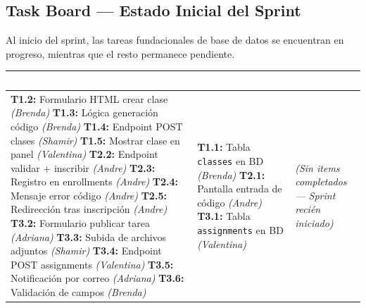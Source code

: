 \documentclass[12pt,a4paper]{article}
\renewcommand{\arraystretch}{1.45}
\begin{document}
\subsection{Task Board — Estado Inicial del Sprint}

Al inicio del sprint, las tareas fundacionales de base de datos se encuentran en progreso, mientras que el resto permanece pendiente.

\vspace{0.8em}

\renewcommand{\arraystretch}{1.2}
\noindent
\begin{tabularx}{\textwidth}{|>{}Y|>{}Y|>{}Y|}
\hline
{}
\centering\textcolor{white}{\textbf{TO DO}} &
\centering\textcolor{white}{\textbf{IN PROGRESS}} &
\centering\arraybackslash\textcolor{white}{\textbf{DONE}} \\
\hline

\textbf{T1.2:} Formulario HTML crear clase \textit{(Brenda)}\newline
\textbf{T1.3:} Lógica generación código \textit{(Brenda)}\newline
\textbf{T1.4:} Endpoint POST clases \textit{(Shamir)}\newline
\textbf{T1.5:} Mostrar clase en panel \textit{(Valentina)}\newline
\textbf{T2.2:} Endpoint validar + inscribir \textit{(Andre)}\newline
\textbf{T2.3:} Registro en enrollments \textit{(Andre)}\newline
\textbf{T2.4:} Mensaje error código \textit{(Andre)}\newline
\textbf{T2.5:} Redirección tras inscripción \textit{(Andre)}\newline
\textbf{T3.2:} Formulario publicar tarea \textit{(Adriana)}\newline
\textbf{T3.3:} Subida de archivos adjuntos \textit{(Shamir)}\newline
\textbf{T3.4:} Endpoint POST assignments \textit{(Valentina)}\newline
\textbf{T3.5:} Notificación por correo \textit{(Adriana)}\newline
\textbf{T3.6:} Validación de campos \textit{(Brenda)}

&
\textbf{T1.1:} Tabla \texttt{classes} en BD \textit{(Brenda)}\newline\newline
\textbf{T2.1:} Pantalla entrada de código \textit{(Andre)}\newline\newline
\textbf{T3.1:} Tabla \texttt{assignments} en BD \textit{(Valentina)}

&
\textit{(Sin items completados — Sprint recién iniciado)} \\ \hline
\end{tabularx}
\end{document}
